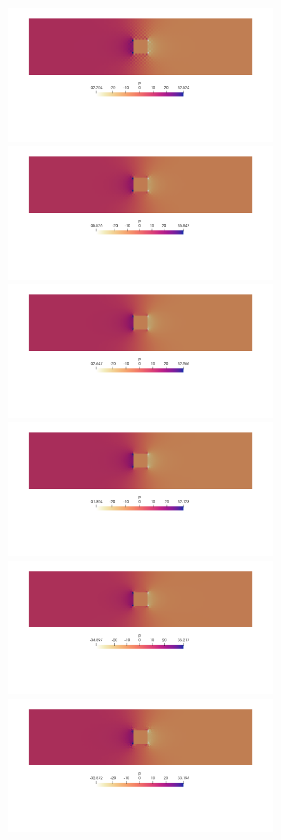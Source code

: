 \begin{center}
\includegraphics[width=7cm]{python_codes/fieldstone_78/results/cylinder/p0}
\includegraphics[width=7cm]{python_codes/fieldstone_78/results/cylinder/p1}\\
\includegraphics[width=7cm]{python_codes/fieldstone_78/results/cylinder/p2}
\includegraphics[width=7cm]{python_codes/fieldstone_78/results/cylinder/p3}\\
\includegraphics[width=7cm]{python_codes/fieldstone_78/results/cylinder/p4}
\includegraphics[width=7cm]{python_codes/fieldstone_78/results/cylinder/p5}\\

\end{center}
